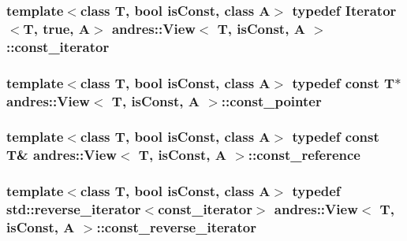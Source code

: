 \subsubsection[{const\+\_\+iterator}]{\setlength{\rightskip}{0pt plus 5cm}template$<$class T, bool is\+Const, class A$>$ typedef {\bf Iterator}$<$T, true, A$>$ {\bf andres\+::\+View}$<$ T, is\+Const, A $>$\+::{\bf const\+\_\+iterator}}\label{classandres_1_1View_a7b6f125a7b3830f30cd34887b61858a7}
\hypertarget{classandres_1_1View_a947d02064bced23437b804a8050e6ccb}{}
\subsubsection[{const\+\_\+pointer}]{\setlength{\rightskip}{0pt plus 5cm}template$<$class T, bool is\+Const, class A$>$ typedef const T$\ast$ {\bf andres\+::\+View}$<$ T, is\+Const, A $>$\+::{\bf const\+\_\+pointer}}\label{classandres_1_1View_a947d02064bced23437b804a8050e6ccb}
\hypertarget{classandres_1_1View_a69e3d49e3d8242a33c03d42dd5ecc5b8}{}
\subsubsection[{const\+\_\+reference}]{\setlength{\rightskip}{0pt plus 5cm}template$<$class T, bool is\+Const, class A$>$ typedef const T\& {\bf andres\+::\+View}$<$ T, is\+Const, A $>$\+::{\bf const\+\_\+reference}}\label{classandres_1_1View_a69e3d49e3d8242a33c03d42dd5ecc5b8}
\hypertarget{classandres_1_1View_a61656971b73a48c8bf009e3200aad900}{}
\subsubsection[{const\+\_\+reverse\+\_\+iterator}]{\setlength{\rightskip}{0pt plus 5cm}template$<$class T, bool is\+Const, class A$>$ typedef std\+::reverse\+\_\+iterator$<${\bf const\+\_\+iterator}$>$ {\bf andres\+::\+View}$<$ T, is\+Const, A $>$\+::{\bf const\+\_\+reverse\+\_\+iterator}}\label{classandres_1_1View_a61656971b73a48c8bf009e3200aad900}
\hypertarget{classandres_1_1View_aef54ee0a58e755b897398493d05a44df}{}
